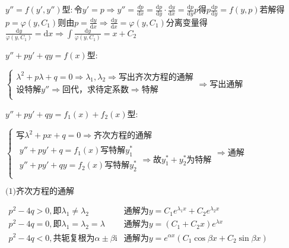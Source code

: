 \begin{spacing}{\hangju}
    \noindent $y''=f(y', y'')$型$\colon$令$y' = p \Rightarrow y'' = \frac{\mathrm{}{d}p}{\mathrm{d}x} = \frac{\mathrm{d}p}{\mathrm{d}y} \cdot \frac{\mathrm{d}y}{\mathrm{d}x} = \frac{\mathrm{d}p}{\mathrm{d}y}p$得$p\frac{\mathrm{d}p}{\mathrm{d}y} = f(y, p)$若解得$p = \varphi(y, C_1)$则由$p = \frac{\mathrm{d}y}{\mathrm{d}x} \Rightarrow \frac{\mathrm{d}y}{\mathrm{d}x} = \varphi(y, C_1)$分离变量得$\frac{\mathrm{d}y}{\varphi(y, C_1)} = \mathrm{d}x \Rightarrow \int{\frac{\mathrm{d}y}{\varphi(y, C_1)}} = x + C_2$

    \noindent $y'' + py' + qy = f(x)$型$\colon$

    \noindent $\left\{
        \begin{array}{l}
            \lambda^2 + p\lambda + q = 0 \Rightarrow \lambda_1, \lambda_2 \Rightarrow \mbox{写出齐次方程的通解}\\
            \mbox{设特解}y'' \Rightarrow \mbox{回代，求待定系数} \Rightarrow \mbox{特解} \\
        \end{array}
    \right.
    \Rightarrow \mbox{写出通解}$

    \noindent $y'' + py' + qy = f_1(x) + f_2(x)$型$\colon$

    \noindent $\left\{
        \begin{array}{l}
            \mbox{写}\lambda^2 + px + q = 0 \Rightarrow \mbox{齐次方程的通解} \\
            \begin{array}{l}
                y'' + py' + q = f_1(x) \mbox{写特解}y_{1}^{*} \\
                y'' + py' + qy = f_2(x) \mbox{写特解}y_{2}^{*} \\
            \end{array} \Rightarrow \mbox{故}y_{1}^{*} + y_{2}^{*}\mbox{为特解}
        \end{array}
    \right. \Rightarrow \mbox{通解}$

    \noindent $\mbox{(1)齐次方程的通解}$

    \noindent $\begin{array}{ll}
        p^2-4q > 0,\mbox{即} \lambda_1 \neq \lambda_2 & \mbox{通解为}y = C_1e^{\lambda_1x} + C_2e^{\lambda_2x}\\
        p^2-4q = 0,\mbox{即} \lambda_1 = \lambda_2 = \lambda & \mbox{通解为}y = (C_1 + C_2x)e^{\lambda x}\\
        p^2-4q < 0,\mbox{共轭复根为}\alpha \pm \beta \mathrm{i} & \mbox{通解为}y = e^{\alpha x}(C_1\cos{\beta x} + C_2\sin{\beta x})\\
    \end{array}$


\end{spacing}
